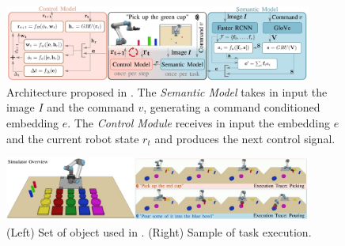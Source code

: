 \begin{figure}[t]
    \centering
    \includegraphics[width=0.9\textwidth]{figures/images/language_conditioned/architecture.jpg}
    \caption{Architecture proposed in \cite{stepputtis2020language}. The \textit{Semantic Model} takes in input the image $I$ and the command $v$, generating a command conditioned embedding $e$. The \textit{Control Module} receives in input the embedding $e$ and the current robot state $r_{t}$ and produces the next control signal.}
    \label{fig:language_conditioned}
\end{figure}

\begin{figure}[t]
    \centering
    \includegraphics[width=0.9\textwidth]{figures/images/language_conditioned/objects.jpg}
    \caption{(Left) Set of object used in \cite{stepputtis2020language}. (Right) Sample of task execution.}
    \label{fig:objects}
\end{figure}
